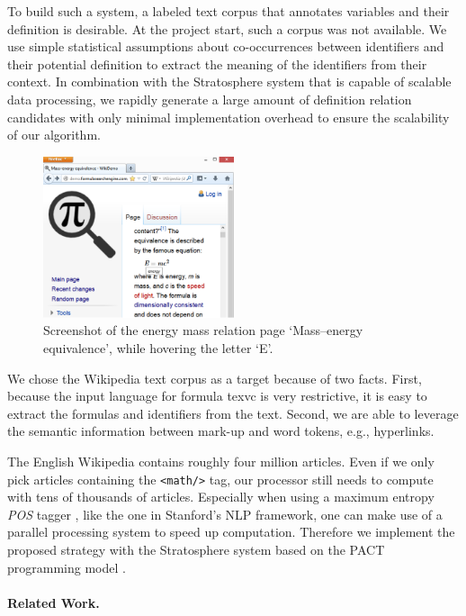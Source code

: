 \documentclass[runningheads]{llncs}
\begin{document}
To build such a system, a labeled text corpus that annotates variables
and their definition is desirable.
At the project start, such a corpus was not available.
We use simple statistical assumptions about co-occurrences between identifiers
and their potential definition to extract the meaning of the identifiers from their context.
In combination with the Stratosphere system
that is capable of scalable data processing,  we rapidly generate a large amount of 
definition relation 
candidates with only minimal implementation overhead to ensure the scalability of our algorithm.

\begin{figure}
        \label{fig:screenshot}
  \includegraphics[width=0.5\textwidth]{screenshot}
  \caption{Screenshot of the energy mass relation page `Mass–energy equivalence', while hovering the letter `E'.}
  \vspace{-20pt}
\end{figure}
We chose the Wikipedia text corpus as a target because of two facts.
First, because the input language for formula texvc is very restrictive, it is easy to extract the formulas and identifiers from the text.
Second, we are able to leverage the semantic information between mark-up and
word tokens, e.g., hyperlinks.

The English Wikipedia contains roughly four million articles.
Even if we only
pick articles containing the \texttt{<math/>} tag, our processor still needs
to compute with tens of thousands of articles.
Especially when using a maximum
entropy \emph{POS} tagger \cite{Rathna96}, like the one in Stanford's NLP
framework, one can make use of a parallel processing system to speed up
computation.
Therefore we implement the proposed strategy with the Stratosphere system based
on the PACT programming model \cite{Alexandrov2010}.


\paragraph{Related Work.}
\end{document}
